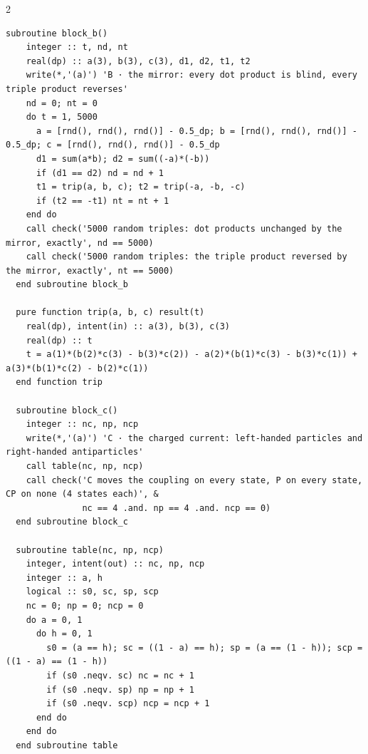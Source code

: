\documentclass[10pt]{article}
\begin{document}
\begin{multicols}{2}
\begin{Verbatim}[fontsize=\fontsize{6.2}{7.2}\selectfont,breaklines,breakanywhere,breaksymbolleft={}]
  subroutine block_b()
    integer :: t, nd, nt
    real(dp) :: a(3), b(3), c(3), d1, d2, t1, t2
    write(*,'(a)') 'B · the mirror: every dot product is blind, every triple product reverses'
    nd = 0; nt = 0
    do t = 1, 5000
      a = [rnd(), rnd(), rnd()] - 0.5_dp; b = [rnd(), rnd(), rnd()] - 0.5_dp; c = [rnd(), rnd(), rnd()] - 0.5_dp
      d1 = sum(a*b); d2 = sum((-a)*(-b))
      if (d1 == d2) nd = nd + 1
      t1 = trip(a, b, c); t2 = trip(-a, -b, -c)
      if (t2 == -t1) nt = nt + 1
    end do
    call check('5000 random triples: dot products unchanged by the mirror, exactly', nd == 5000)
    call check('5000 random triples: the triple product reversed by the mirror, exactly', nt == 5000)
  end subroutine block_b

  pure function trip(a, b, c) result(t)
    real(dp), intent(in) :: a(3), b(3), c(3)
    real(dp) :: t
    t = a(1)*(b(2)*c(3) - b(3)*c(2)) - a(2)*(b(1)*c(3) - b(3)*c(1)) + a(3)*(b(1)*c(2) - b(2)*c(1))
  end function trip

  subroutine block_c()
    integer :: nc, np, ncp
    write(*,'(a)') 'C · the charged current: left-handed particles and right-handed antiparticles'
    call table(nc, np, ncp)
    call check('C moves the coupling on every state, P on every state, CP on none (4 states each)', &
               nc == 4 .and. np == 4 .and. ncp == 0)
  end subroutine block_c

  subroutine table(nc, np, ncp)
    integer, intent(out) :: nc, np, ncp
    integer :: a, h
    logical :: s0, sc, sp, scp
    nc = 0; np = 0; ncp = 0
    do a = 0, 1
      do h = 0, 1
        s0 = (a == h); sc = ((1 - a) == h); sp = (a == (1 - h)); scp = ((1 - a) == (1 - h))
        if (s0 .neqv. sc) nc = nc + 1
        if (s0 .neqv. sp) np = np + 1
        if (s0 .neqv. scp) ncp = ncp + 1
      end do
    end do
  end subroutine table


\end{Verbatim}
\end{multicols}
\end{document}
